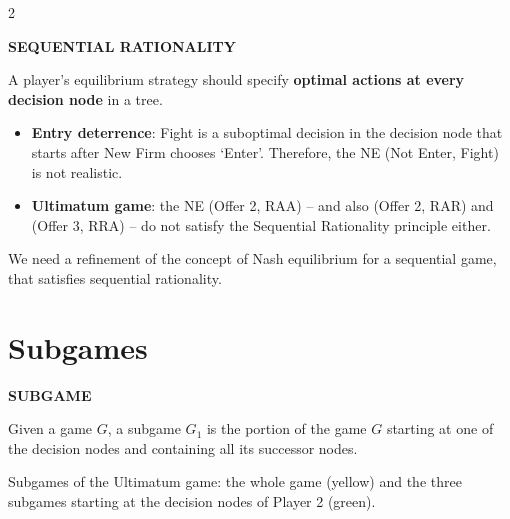 \documentclass[a4paper,9pt]{extarticle}
\begin{document}
\begin{multicols}{2}
\begin{definition}

\textbf{SEQUENTIAL RATIONALITY}

A player's equilibrium strategy should specify \textbf{optimal actions at every decision
node} in a tree.

\end{definition}


\begin{example}

\begin{itemize}

\item \textbf{Entry deterrence}: Fight is a suboptimal decision in the decision node that
starts after New Firm chooses `Enter'. Therefore, the NE (Not Enter, Fight) is not
realistic.

\item \textbf{Ultimatum game}: the NE (Offer 2, RAA) -- and also (Offer 2, RAR) and
(Offer 3, RRA) -- do not satisfy the Sequential Rationality principle either.

\end{itemize}

\end{example}


\begin{important}

We need a refinement of the concept of Nash equilibrium for a sequential game, that satisfies
sequential rationality.

\end{important}



\section{Subgames}


\begin{definition}

\textbf{SUBGAME}

Given a game $G$, a subgame $G_1$ is the portion of the game $G$ starting at one of the
decision nodes and containing all its successor nodes.

\end{definition}


\begin{example}

Subgames of the Ultimatum game: the whole game (yellow) and the three subgames starting at
the decision nodes of Player 2 (green).


\end{example}
\end{multicols}
\end{document}
